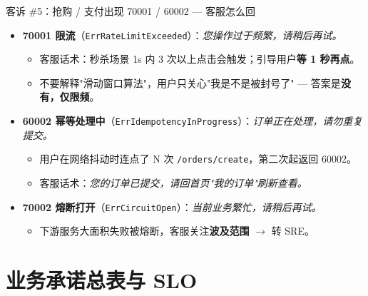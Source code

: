 \documentclass[aspectratio=169,11pt]{beamer}
\begin{document}
\begin{frame}[shrink]{客诉 \#5：抢购 / 支付出现 70001 / 60002 — 客服怎么回}
\begin{itemize}
  \item \textbf{70001 限流}（\texttt{ErrRateLimitExceeded}）：\textit{您操作过于频繁，请稍后再试。}
  \begin{itemize}
    \item 客服话术：秒杀场景 1s 内 3 次以上点击会触发；引导用户\textbf{等 1 秒再点}。
    \item 不要解释"滑动窗口算法"，用户只关心"我是不是被封号了" — 答案是\textbf{没有，仅限频}。
  \end{itemize}
  \item \textbf{60002 幂等处理中}（\texttt{ErrIdempotencyInProgress}）：\textit{订单正在处理，请勿重复提交。}
  \begin{itemize}
    \item 用户在网络抖动时连点了 N 次 \texttt{/orders/create}，第二次起返回 60002。
    \item 客服话术：\textit{您的订单已提交，请回首页"我的订单"刷新查看。}
  \end{itemize}
  \item \textbf{70002 熔断打开}（\texttt{ErrCircuitOpen}）：\textit{当前业务繁忙，请稍后再试。}
  \begin{itemize}
    \item 下游服务大面积失败被熔断，客服关注\textbf{波及范围} $\to$ 转 SRE。
  \end{itemize}
\end{itemize}
\end{frame}

\section{业务承诺总表与 SLO}
\end{document}
